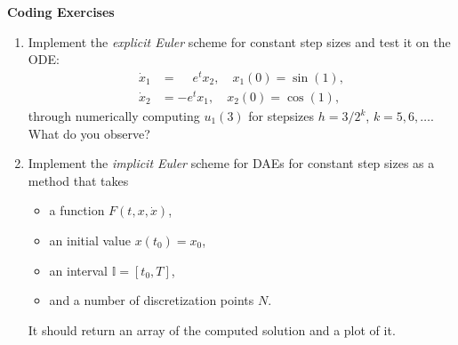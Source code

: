 \documentclass[a4paper,10pt]{article}
\begin{document}
{\bf Coding Exercises}
\begin{enumerate}
	\item Implement the \emph{explicit Euler} scheme for constant step sizes and test it on the ODE:
		\begin{align*}
			\dot x_1 &= \phantom{-}e^tx_2, \quad x_1(0)=\sin(1),\\
			\dot x_2 &= -e^tx_1, \quad x_2(0)=\cos(1),
		\end{align*}
		through numerically computing $u_1(3)$ for stepsizes $h=3/2^k$, $k=5,6,\dots$. What do you observe? 
	\item Implement the \emph{implicit Euler} scheme for DAEs for constant step sizes as a method that takes 
		\begin{itemize}
			\item a function $F(t,x,\dot x)$,
			\item an initial value $x(t_0) = x_0$,
			\item an interval $\mathbb I = [t_0, T]$,
			\item and a number of discretization points $N$. 
		\end{itemize}
		It should return an array of the computed solution and a plot of it.
		

\end{enumerate}
\end{document}

